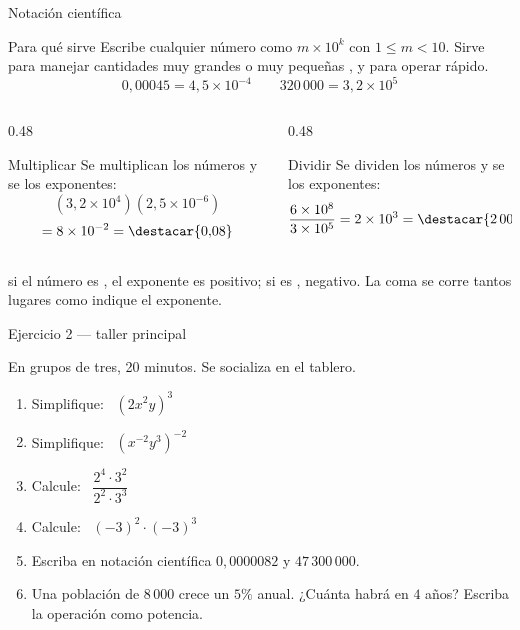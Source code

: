 \documentclass[aspectratio=169,10pt]{beamer}
\begin{document}
\begin{frame}{Notación científica}
  \scriptsize
  \begin{block}{Para qué sirve}
    \tiny
    Escribe cualquier número como $m\times 10^{k}$ con $1\le m < 10$. Sirve
    para manejar cantidades muy grandes o muy pequeñas
    , y para operar rápido.
    \[ 0{,}00045 = 4{,}5\times 10^{-4}
       \qquad
       320\,000 = 3{,}2\times 10^{5} \]
  \end{block}

  \vspace{0.1cm}
  \begin{columns}[T,onlytextwidth]
    \begin{column}{0.48\textwidth}
      \begin{exampleblock}{Multiplicar}
        \tiny
        Se multiplican los números y se  los exponentes:
        \[ (3{,}2\times 10^{4})(2{,}5\times 10^{-6}) \]
        \[ = 8\times 10^{-2} = \destacar{0{,}08} \]
      \end{exampleblock}
    \end{column}
    \begin{column}{0.48\textwidth}
      \begin{exampleblock}{Dividir}
        \tiny
        Se dividen los números y se  los exponentes:
        \[ \frac{6\times 10^{8}}{3\times 10^{5}}
           = 2\times 10^{3} = \destacar{2\,000} \]
      \end{exampleblock}
    \end{column}
  \end{columns}

  \vspace{0.08cm}
  {\tiny\color{uniGris}  si el número es
  , el exponente es positivo; si es ,
  negativo. La coma se corre tantos lugares como indique el exponente.}
\end{frame}

\begin{frame}{Ejercicio 2 — taller principal}
  \begin{alertblock}{En grupos de tres, 20 minutos. Se socializa en el tablero.}
    \scriptsize
    \begin{enumerate}\setlength{\itemsep}{0.0cm}
      \item Simplifique: \ $(2x^{2}y)^{3}$
      \item Simplifique: \ $(x^{-2}y^{3})^{-2}$
      \item Calcule: \ $\dfrac{2^{4}\cdot 3^{2}}{2^{2}\cdot 3^{3}}$
      \item Calcule: \ $(-3)^{2}\cdot(-3)^{3}$
      \item Escriba en notación científica $0{,}0000082$ y $47\,300\,000$.
      \item Una población de $8\,000$ crece un $5\%$ anual. ¿Cuánta habrá en
            $4$ años? Escriba la operación como potencia.
    \end{enumerate}
  \end{alertblock}
\end{frame}
\end{document}
